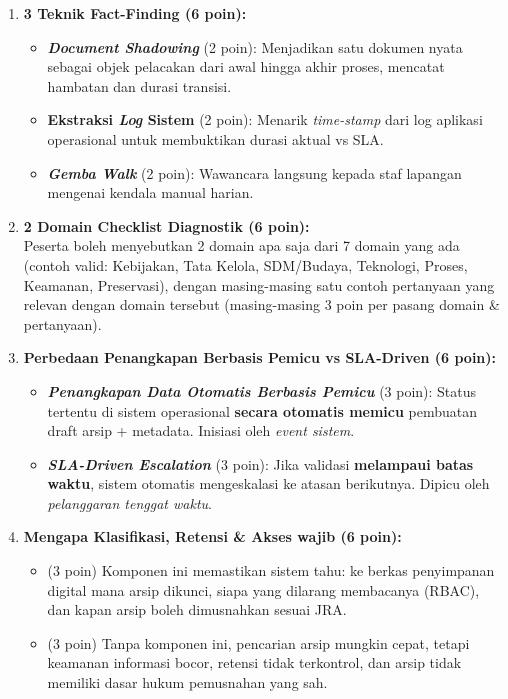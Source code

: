 \documentclass[12pt,a4paper]{report}
\begin{document}
\begin{enumerate}[leftmargin=*, itemsep=0.4cm]

\item \textbf{3 Teknik Fact-Finding (6 poin):}
\begin{itemize}[nosep]
    \item \textbf{\textit{Document Shadowing}} (2 poin): Menjadikan satu dokumen nyata sebagai objek pelacakan dari awal hingga akhir proses, mencatat hambatan dan durasi transisi.
    \item \textbf{Ekstraksi \textit{Log} Sistem} (2 poin): Menarik \textit{time-stamp} dari log aplikasi operasional untuk membuktikan durasi aktual vs SLA.
    \item \textbf{\textit{Gemba Walk}} (2 poin): Wawancara langsung kepada staf lapangan mengenai kendala manual harian.
\end{itemize}

\item \textbf{2 Domain Checklist Diagnostik (6 poin):}\\
Peserta boleh menyebutkan 2 domain apa saja dari 7 domain yang ada (contoh valid: Kebijakan, Tata Kelola, SDM/Budaya, Teknologi, Proses, Keamanan, Preservasi), dengan masing-masing satu contoh pertanyaan yang relevan dengan domain tersebut (masing-masing 3 poin per pasang domain \& pertanyaan).

\item \textbf{Perbedaan Penangkapan Berbasis Pemicu vs SLA-Driven (6 poin):}
\begin{itemize}[nosep]
    \item \textbf{\textit{Penangkapan Data Otomatis Berbasis Pemicu}} (3 poin): Status tertentu di sistem operasional \textbf{secara otomatis memicu} pembuatan draft arsip + metadata. Inisiasi oleh \textit{event sistem}.
    \item \textbf{\textit{SLA-Driven Escalation}} (3 poin): Jika validasi \textbf{melampaui batas waktu}, sistem otomatis mengeskalasi ke atasan berikutnya. Dipicu oleh \textit{pelanggaran tenggat waktu}.
\end{itemize}

\item \textbf{Mengapa Klasifikasi, Retensi \& Akses wajib (6 poin):}
\begin{itemize}[nosep]
    \item (3 poin) Komponen ini memastikan sistem tahu: ke berkas penyimpanan digital mana arsip dikunci, siapa yang dilarang membacanya (RBAC), dan kapan arsip boleh dimusnahkan sesuai JRA.
    \item (3 poin) Tanpa komponen ini, pencarian arsip mungkin cepat, tetapi keamanan informasi bocor, retensi tidak terkontrol, dan arsip tidak memiliki dasar hukum pemusnahan yang sah.
\end{itemize}


\end{enumerate}
\end{document}
